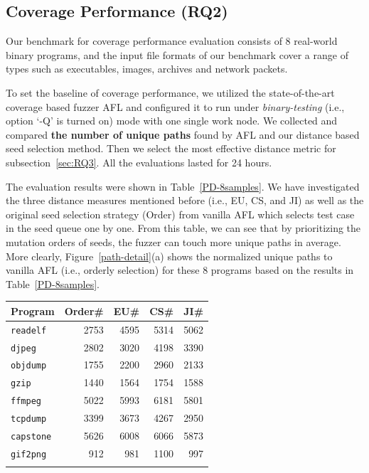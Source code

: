 \subsection{Coverage Performance (RQ2)}\label{sec:RQ2}
Our benchmark for coverage performance evaluation consists of 8 real-world binary 
programs, and the input file formats of our benchmark cover a range of types such 
as executables, images, archives and network packets.

To set the baseline of coverage performance, we utilized the state-of-the-art 
coverage based fuzzer AFL \cite{online:afl} and configured it to run under 
\textit{binary-testing} (i.e., option `-Q' is turned on) mode with one 
single work node.
 We collected and compared \textbf{the number of unique paths} found by 
 AFL and our distance based seed selection method.
 Then we select the most effective distance metric for 
 subsection~\ref{sec:RQ3}.
 All the evaluations lasted for 24 hours.

The evaluation results were shown in Table~\ref{PD-8samples}. We have 
investigated the three distance measures mentioned before (i.e., EU, CS, 
and JI) as well as the original seed selection strategy (Order) from 
vanilla AFL which selects test case in the seed queue one by one.
From this table, we can see that by prioritizing the mutation orders of 
seeds, the fuzzer can touch more unique paths in average.
 More clearly, Figure~\ref{path-detail}(a) shows the normalized unique 
 paths to vanilla AFL (i.e., orderly selection) for these 8 programs 
 based on the results in Table~\ref{PD-8samples}.
\begin{table}[!b]
{\begin{tabular*}{20pc}{@{\extracolsep{\fill}}lrrrr@{}}\toprule
	     Program  & Order\# & EU\# & CS\# & JI\# \\
\midrule
		\texttt{readelf}  &    2753 & 4595 & 5314 & 5062 \\
		 \texttt{djpeg }  &    2802 & 3020 & 4198 & 3390 \\
		\texttt{objdump} &    1755 & 2200 & 2960 & 2133 \\
		 \texttt{gzip }  &    1440 & 1564 & 1754 & 1588 \\
		 \texttt{ffmpeg}  &    5022 & 5993 & 6181 & 5801 \\
		\texttt{tcpdump}  &    3399 & 3673 & 4267 & 2950 \\
		\texttt{capstone} &    5626 & 6008 & 6066 & 5873 \\
		\texttt{gif2png}  &     912 &  981 & 1100 &  997 \\ 
\botrule
\end{tabular*}}{}
\end{table}


